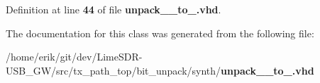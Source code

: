 Definition at line {\bf 44} of file {\bf unpack\+\_\+\_\+to\+\_.\+vhd}.



The documentation for this class was generated from the following file\+:\begin{DoxyCompactItemize}
\item 
/home/erik/git/dev/\+Lime\+S\+D\+R-\/\+U\+S\+B\+\_\+\+G\+W/src/tx\+\_\+path\+\_\+top/bit\+\_\+unpack/synth/{\bf unpack\+\_\+\_\+to\+\_.\+vhd}\end{DoxyCompactItemize}
